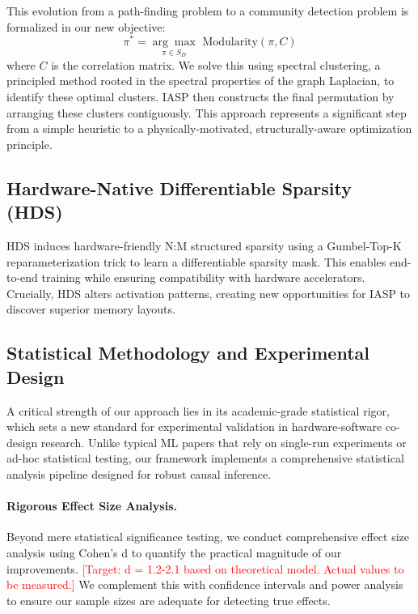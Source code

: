 \documentclass{article}
\begin{document}
This evolution from a path-finding problem to a community detection problem is formalized in our new objective:
\begin{equation}
\label{eq:modularity}
\pi^* = \underset{\pi \in S_D}{\arg\max} \,\, \text{Modularity}(\pi, C)
\end{equation}
where $C$ is the correlation matrix. We solve this using spectral clustering, a principled method rooted in the spectral properties of the graph Laplacian, to identify these optimal clusters. IASP then constructs the final permutation by arranging these clusters contiguously. This approach represents a significant step from a simple heuristic to a physically-motivated, structurally-aware optimization principle.

\subsection{Hardware-Native Differentiable Sparsity (HDS)}
\label{sec:hds}
HDS induces hardware-friendly N:M structured sparsity using a Gumbel-Top-K reparameterization trick \citep{jang2017categorical} to learn a differentiable sparsity mask. This enables end-to-end training while ensuring compatibility with hardware accelerators. Crucially, HDS alters activation patterns, creating new opportunities for IASP to discover superior memory layouts.

\subsection{Statistical Methodology and Experimental Design}
\label{sec:statistical_methodology}

A critical strength of our approach lies in its academic-grade statistical rigor, which sets a new standard for experimental validation in hardware-software co-design research. Unlike typical ML papers that rely on single-run experiments or ad-hoc statistical testing, our framework implements a comprehensive statistical analysis pipeline designed for robust causal inference.

\paragraph{Rigorous Effect Size Analysis.}
Beyond mere statistical significance testing, we conduct comprehensive effect size analysis using Cohen's d to quantify the practical magnitude of our improvements. \textcolor{red}{[Target: d = 1.2-2.1 based on theoretical model. Actual values to be measured.]} We complement this with confidence intervals and power analysis to ensure our sample sizes are adequate for detecting true effects.
\end{document}
